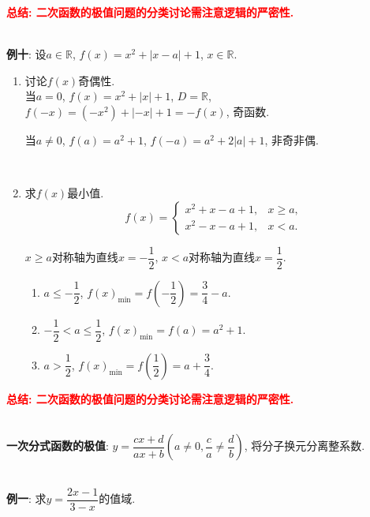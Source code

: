 \documentclass[8pt]{article}
\begin{document}
					\textbf{\textcolor{red}{总结: 二次函数的极值问题的分类讨论需注意逻辑的严密性.}}

				~\\

				\textbf{例十}: 设$a\in\mathbb{R}$, $f(x)=x^2+|x-a|+1$, $x\in\mathbb{R}$.
					\begin{enumerate}[label=(\arabic*)]
						\item 讨论$f(x)$奇偶性.
							~\\

							当$a=0$, $f(x)=x^2+|x|+1$, $D=\mathbb{R}$, $f(-x)=(-x^2)+|-x|+1=-f(x)$, 奇函数.

							当$a\neq 0$, $f(a)=a^2+1$, $f(-a)=a^2+2|a|+1$, 非奇非偶.

							~\\

						\item 求$f(x)$最小值.
							~\\

							$$f(x)=\left\{\begin{array}{rl}x^2+x-a+1, &x\geq a,\\x^2-x-a+1, &x<a.\end{array}\right.$$

							$x\geq a$对称轴为直线$x=-\dfrac{1}{2}$, $x<a$对称轴为直线$x=\dfrac{1}{2}$.

							\begin{enumerate}[label=$\arabic*^{\circ}$]
								\item $a\leq -\dfrac{1}{2}$, $f(x)_{\min} = f\left(-\dfrac{1}{2}\right)=\dfrac{3}{4}-a$.
								\item $-\dfrac{1}{2}<a\leq\dfrac{1}{2}$, $f(x)_{\min} = f(a) = a^2+1$.
								\item $a>\dfrac{1}{2}$, $f(x)_{\min}=f\left(\dfrac{1}{2}\right)=a+\dfrac{3}{4}$.
							\end{enumerate}
							
					\end{enumerate}

					\textbf{\textcolor{red}{总结: 二次函数的极值问题的分类讨论需注意逻辑的严密性.}}

				~\\

				\textbf{一次分式函数的极值}: $y=\dfrac{cx+d}{ax+b} (a\neq 0, \dfrac{c}{a} \neq \dfrac{d}{b})$, 将分子换元分离整系数.

				~\\

				\textbf{例一}: 求$y=\dfrac{2x-1}{3-x}$的值域.
					~\\
\end{document}
